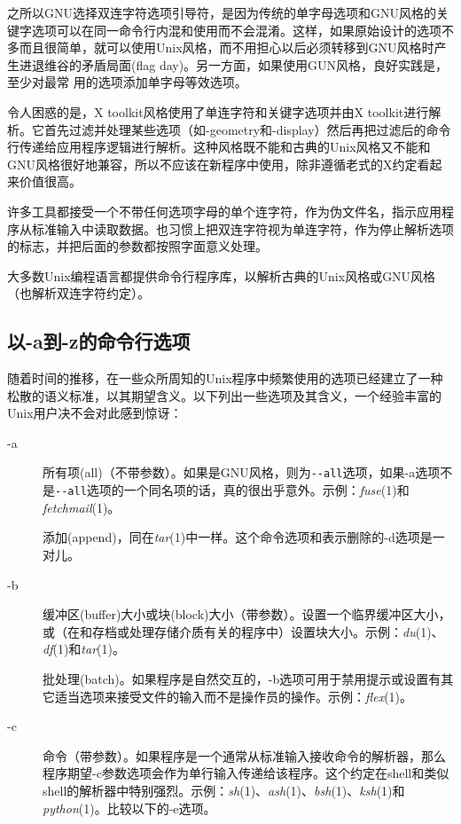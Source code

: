 \documentclass[12pt,oneside]{ctexbook}
\begin{document}
\begin{common-format}
之所以GNU选择双连字符选项引导符，是因为传统的单字母选项和GNU风格的关键字选项可以在同一命令行内混和使用而不会混淆。这样，如果原始设计的选项不多而且很简单，就可以使用Unix风格，而不用担心以后必须转移到GNU风格时产生进退维谷的矛盾局面(flag day)。另一方面，如果使用GUN风格，良好实践是，至少对最常
用的选项添加单字母等效选项。

令人困惑的是，X toolkit风格使用了单连字符和关键字选项并由X toolkit进行解析。它首先过滤并处理某些选项（如-geometry和-display）然后再把过滤后的命令行传递给应用程序逻辑进行解析。这种风格既不能和古典的Unix风格又不能和GNU风格很好地兼容，所以不应该在新程序中使用，除非遵循老式的X约定看起来价值很高。

许多工具都接受一个不带任何选项字母的单个连字符，作为伪文件名，指示应用程序从标准输入中读取数据。也习惯上把双连字符视为单连字符，作为停止解析选项的标志，并把后面的参数都按照字面意义处理。

大多数Unix编程语言都提供命令行程序库，以解析古典的Unix风格或GNU风格（也解析双连字符约定）。

\subsection{以-a到-z的命令行选项}
随着时间的推移，在一些众所周知的Unix程序中频繁使用的选项已经建立了一种松散的语义标准，以其期望含义。以下列出一些选项及其含义，一个经验丰富的Unix用户决不会对此感到惊讶：
\begin{description}
\item[-a] 所有项(all)（不带参数）。如果是GNU风格，则为\verb+--all+选项，如果-a选项不是\verb+--all+选项的一个同名项的话，真的很出乎意外。示例：\textit{fuse}(1)和\textit{fetchmail}(1)。

添加(append)，同在\textit{tar}(1)中一样。这个命令选项和表示删除的-d选项是一对儿。
\item[-b] 缓冲区(buffer)大小或块(block)大小（带参数）。设置一个临界缓冲区大小，或（在和存档或处理存储介质有关的程序中）设置块大小。示例：\textit{du}(1)、\textit{df}(1)和\textit{tar}(1)。

批处理(batch)。如果程序是自然交互的，-b选项可用于禁用提示或设置有其它适当选项来接受文件的输入而不是操作员的操作。示例：\textit{flex}(1)。
\item[-c] 命令（带参数）。如果程序是一个通常从标准输入接收命令的解析器，那么程序期望-c参数选项会作为单行输入传递给该程序。这个约定在shell和类似shell的解析器中特别强烈。示例：\textit{sh}(1)、\textit{ash}(1)、\textit{bsh}(1)、\textit{ksh}(1)和\textit{python}(1)。比较以下的-e选项。


\end{description}
\end{common-format}
\end{document}
